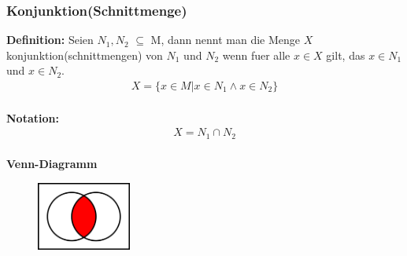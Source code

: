 \documentclass[../AbiMappe_Mathe.tex]{subfiles}
\begin{document}
\subsubsection{Konjunktion(Schnittmenge)}
\textbf{Definition:} Seien $N_1,N_2$ $\subseteq$ M, dann nennt man die Menge $X$ konjunktion(schnittmengen) von $N_1$ und  $N_2$ wenn fuer alle $x \in X$ gilt, das $x \in N_1$ und $x \in N_2$.
\begin{align*}
X=\{x \in M| x \in N_1 \land x \in N_2 \}
\end{align*}
\\
\textbf{Notation:}
\begin{align*}
X=N_1 \cap N_2
\end{align*}
\\
\textbf{Venn-Diagramm}
\begin{figure}[H]
\centering
\includegraphics[width=117px, height=85.5px]{VennKon.png}
\end{figure}
\end{document}
